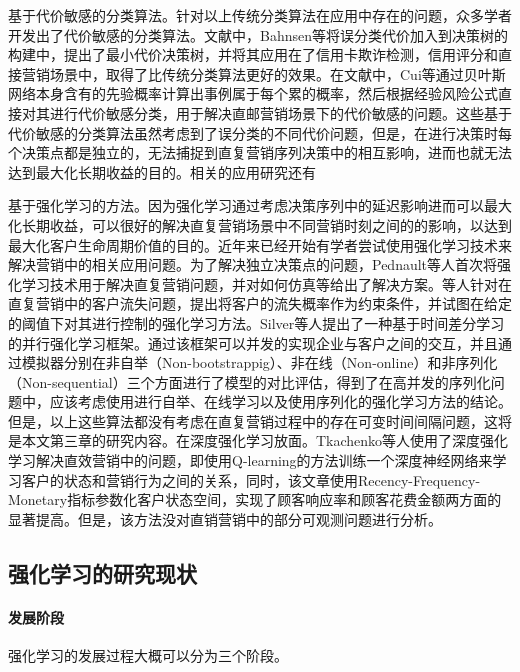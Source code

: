 基于代价敏感的分类算法。针对以上传统分类算法在应用中存在的问题，众多学者开发出了代价敏感的分类算法。文献\citep{bahnsen2015example}中，Bahnsen等将误分类代价加入到决策树的构建中，提出了最小代价决策树，并将其应用在了信用卡欺诈检测，信用评分和直接营销场景中，取得了比传统分类算法更好的效果。在文献\citep{cui2012cost}中，Cui等通过贝叶斯网络本身含有的先验概率计算出事例属于每个累的概率，然后根据经验风险公式直接对其进行代价敏感分类，用于解决直邮营销场景下的代价敏感的问题。这些基于代价敏感的分类算法虽然考虑到了误分类的不同代价问题，但是，在进行决策时每个决策点都是独立的，无法捕捉到直复营销序列决策中的相互影响，进而也就无法达到最大化长期收益的目的。相关的应用研究还有\citep{migueis2017predicting,zakaryazad2016profit,hu2015cost}

基于强化学习的方法。因为强化学习通过考虑决策序列中的延迟影响进而可以最大化长期收益，可以很好的解决直复营销场景中不同营销时刻之间的的影响，以达到最大化客户生命周期价值的目的。近年来已经开始有学者尝试使用强化学习技术来解决营销中的相关应用问题。为了解决独立决策点的问题，Pednault等人\citep{pednault2002sequential}首次将强化学习技术用于解决直复营销问题，并对如何仿真等给出了解决方案。\citep{kim2009new}等人针对在直复营销中的客户流失问题，提出将客户的流失概率作为约束条件，并试图在给定的阈值下对其进行控制的强化学习方法。Silver等人\citep{silver2013concurrent}提出了一种基于时间差分学习的并行强化学习框架。通过该框架可以并发的实现企业与客户之间的交互，并且通过模拟器分别在非自举（Non-bootstrappig）、非在线（Non-online）和非序列化（Non-sequential）三个方面进行了模型的对比评估，得到了在高并发的序列化问题中，应该考虑使用进行自举、在线学习以及使用序列化的强化学习方法的结论。但是，以上这些算法都没有考虑在直复营销过程中的存在可变时间间隔问题，这将是本文第三章的研究内容。在深度强化学习放面。Tkachenko等人\citep{tkachenko2015autonomous}使用了深度强化学习解决直效营销中的问题，即使用Q-learning的方法训练一个深度神经网络来学习客户的状态和营销行为之间的关系，同时，该文章使用Recency-Frequency-Monetary指标参数化客户状态空间，实现了顾客响应率和顾客花费金额两方面的显著提高。但是，该方法没对直销营销中的部分可观测问题进行分析。

\subsection{强化学习的研究现状}

\paragraph{发展阶段}
强化学习的发展过程大概可以分为三个阶段。

